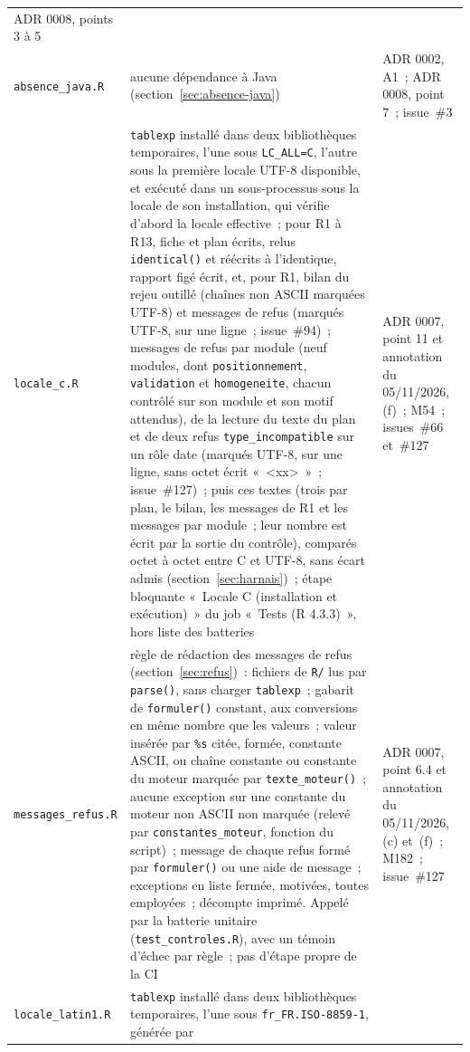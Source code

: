 \documentclass[a4paper,11pt]{article}
\newcommand{\code}[1]{\texttt{\small #1}}
\begin{document}
\begin{center}
\begin{longtable}{@{}p{4.6cm}p{7.4cm}p{2.8cm}@{}}
ADR 0008, points 3 à 5 \\
\code{absence\_java.R} & aucune dépendance à Java
(section~\ref{sec:absence-java}) & ADR 0002, A1~; ADR 0008, point 7~; issue~\#3 \\
\code{locale\_c.R} & \code{tablexp} installé dans deux bibliothèques
temporaires, l'une sous \code{LC\_ALL=C}, l'autre sous la première locale
UTF-8 disponible, et exécuté dans un sous-processus sous la locale de son
installation, qui vérifie d'abord la locale effective~; pour R1 à R13,
fiche et plan écrits, relus \code{identical()} et réécrits à l'identique,
rapport figé écrit, et, pour R1, bilan du rejeu outillé (chaînes non ASCII
marquées UTF-8) et messages de refus (marqués UTF-8, sur une ligne~;
issue~\#94)~; messages de refus par module (neuf modules, dont
\code{positionnement}, \code{validation} et \code{homogeneite}, chacun
contrôlé sur son module et son motif attendus),
de la lecture du texte du
plan et de deux refus \code{type\_incompatible} sur un rôle date
(marqués UTF-8, sur une ligne, sans octet écrit
«~<xx>~»~; issue~\#127)~; puis ces textes (trois par plan, le bilan, les messages
de R1 et les messages par module~; leur nombre est écrit par la sortie du contrôle), comparés
octet à octet entre C et UTF-8, sans écart admis (section~\ref{sec:harnais})~; étape bloquante «~Locale C
(installation et exécution)~» du job «~Tests (R 4.3.3)~», hors liste des
batteries & ADR 0007, point 11 et annotation du 05/11/2026, (f)~; M54~;
issues~\#66 et~\#127 \\
\code{messages\_refus.R} & règle de rédaction des messages de refus
(section~\ref{sec:refus})~: fichiers de \code{R/} lus par \code{parse()},
sans charger \code{tablexp}~; gabarit de \code{formuler()} constant, aux
conversions en même nombre que les valeurs~; valeur insérée par
\code{\%s} citée, formée, constante ASCII, ou chaîne constante ou
constante du moteur marquée par \code{texte\_moteur()}~; aucune exception
sur une constante du moteur non ASCII non marquée (relevé par
\code{constantes\_moteur}, fonction du script)~; message de chaque refus
formé par \code{formuler()} ou une aide de message~; exceptions en liste
fermée, motivées, toutes employées~; décompte imprimé. Appelé par la
batterie unitaire (\code{test\_controles.R}), avec un témoin d'échec par
règle~; pas d'étape propre de la CI & ADR 0007, point 6.4 et annotation
du 05/11/2026, (c) et~(f)~; M182~; issue~\#127 \\
\code{locale\_latin1.R} & \code{tablexp} installé dans deux bibliothèques
temporaires, l'une sous \code{fr\_FR.ISO-8859-1}, générée par

\end{longtable}
\end{center}
\end{document}
